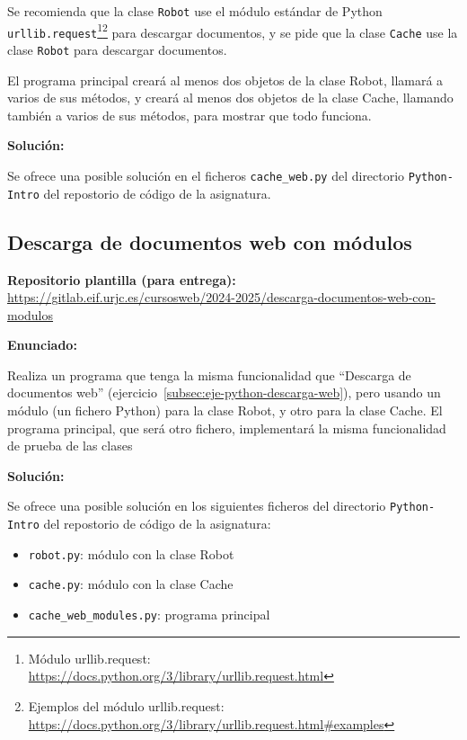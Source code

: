 Se recomienda que la clase \verb|Robot| use el módulo estándar de Python \verb|urllib.request|\footnote{Módulo urllib.request: \\ \url{https://docs.python.org/3/library/urllib.request.html}}\footnote{Ejemplos del módulo urllib.request: \\ \url{https://docs.python.org/3/library/urllib.request.html\#examples}} para descargar documentos, y se pide que la clase \verb|Cache| use la clase \verb|Robot| para descargar documentos.

El programa principal creará al menos dos objetos de la clase Robot, llamará a varios de sus métodos, y creará al menos dos objetos de la clase Cache, llamando también a varios de sus métodos, para mostrar que todo funciona.

\textbf{Solución:}

Se ofrece una posible solución en el ficheros \verb|cache_web.py| del directorio \verb|Python-Intro| del repostorio de código de la asignatura.


\subsection{Descarga de documentos web con módulos}
\label{subsec:eje-python-descarga-web-modulos}

\textbf{Repositorio plantilla (para entrega):} \\
\url{https://gitlab.eif.urjc.es/cursosweb/2024-2025/descarga-documentos-web-con-modulos}

\textbf{Enunciado:}

Realiza un programa que tenga la misma funcionalidad que ``Descarga de documentos web'' (ejercicio~\ref{subsec:eje-python-descarga-web}), pero usando un módulo (un fichero Python) para la clase Robot, y otro para la clase Cache. El programa principal, que será otro fichero, implementará la misma funcionalidad de prueba de las clases

\textbf{Solución:}

Se ofrece una posible solución en los siguientes ficheros del directorio \verb|Python-Intro| del repostorio de código de la asignatura:

\begin{itemize}
\item \verb|robot.py|: módulo con la clase Robot
\item \verb|cache.py|: módulo con la clase Cache
\item \verb|cache_web_modules.py|: programa principal
\end{itemize}

